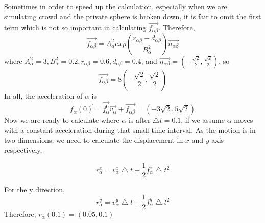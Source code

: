 Sometimes in order to speed up the calculation, especially when we are simulating crowd and the private sphere is broken down, it is fair to omit the first term which is not so important in calculating $\overrightarrow{f_{\alpha \beta}}$.
Therefore,
 \begin{equation}
 \overrightarrow{f_{\alpha \beta}} = A^{2}_{\alpha} exp(\frac{r_{\alpha\beta}-d_{\alpha\beta}}{B^{2}_{\alpha}})\overrightarrow{n_{\alpha \beta}}
 \end{equation}
where $A^{2}_{\alpha}=3, B^{2}_{\alpha}=0.2, r_{\alpha\beta}=0.6, d_{\alpha\beta}=0.4$, and $\overrightarrow{n_{\alpha \beta}}=(-\frac{\sqrt{2}}{2}, \frac{\sqrt{2}}{2})$,
so 
 \begin{equation}
 \overrightarrow{f_{\alpha \beta}} = 8(-\frac{\sqrt{2}}{2}, \frac{\sqrt{2}}{2})
 \end{equation}
In all, the acceleration of $\alpha$ is 
 \begin{equation}
 \overrightarrow{f_{\alpha}(0)} = \overrightarrow{f^{0}_{\alpha}}\overrightarrow{v_{\alpha}} + \overrightarrow{f_{\alpha\beta}} = (-3\sqrt{2}, 5\sqrt{2})
 \end{equation}
Now we are ready to calculate where $\alpha$ is after $\bigtriangleup t=0.1$, if we assume $\alpha$ moves with a constant acceleration during that small time interval.
As the motion is in two dimensions, we need to calculate the displacement in $x$ and $y$ axis respectively.

 \begin{equation}
 r^{x}_{\alpha} = v^{x}_{\alpha} \bigtriangleup t + \frac{1}{2} f^{x}_{\alpha} \bigtriangleup t ^{2}
 \end{equation}
 
 For the y direction,
  \begin{equation}
 r^{y}_{\alpha} = v^{y}_{\alpha} \bigtriangleup t + \frac{1}{2} f^{y}_{\alpha} \bigtriangleup t ^{2}
 \end{equation}
 Therefore, $r_{\alpha}(0.1)= (0.05, 0.1)$



